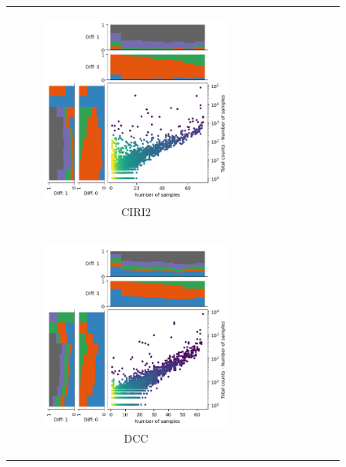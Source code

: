 \begin{figure}[ht]
\begin{tabular}{cc}
\begin{subfigure}{.5\textwidth}
            \includegraphics[width=\linewidth]{chapters/4_results_and_discussion/figures/detection/density/ciriquant.png}
            \caption{CIRI2}
            \label{fig:detection_density_ciriquant}
        \end{subfigure} \\
        \begin{subfigure}{.5\textwidth}
            \centering

            \includegraphics[width=\linewidth]{chapters/4_results_and_discussion/figures/detection/density/dcc.png}
            \caption{DCC}
            \label{fig:detection_density_dcc}
        \end{subfigure}
         &
        \begin{subfigure}{.5\textwidth}
            \centering


\end{subfigure}
\end{tabular}
\end{figure}

